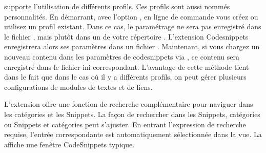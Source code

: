 
\codeblocks supporte l'utilisation de différents profils. Ces profils sont aussi nommés personnalités. En démarrant, avec l'option , \codeblocks en ligne de commande vous créez ou utilisez un profil existant. Dans ce cas, le paramétrage ne sera pas enregistré dans le fichier , mais plutôt dans un  de votre répertoire . L'extension Codesnippets enregistrera alors ses paramètres dans un fichier . Maintenant, si vous chargez un nouveau contenu  dans les paramètres de codesnippets via , ce contenu sera enregistré dans le fichier ini correspondant. L'avantage de cette méthode tient dans le fait que dans le cas où il y a différents profils, on peut gérer plusieurs configurations de modules de textes et de liens.

L'extension offre une fonction de recherche complémentaire pour naviguer dans les catégories et les Snippets. La façon de rechercher dans les Snippets, catégories ou Snippets et catégories peut s'ajuster. En entrant l'expression de recherche requise, l'entrée correspondante est automatiquement sélectionnée dans la vue. La  affiche une fenêtre CodeSnippets typique.



